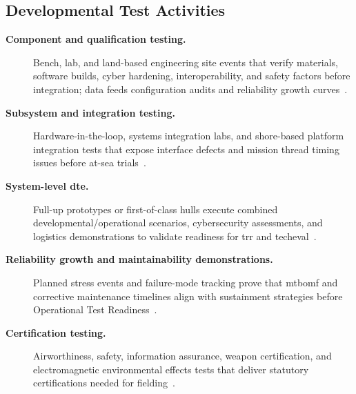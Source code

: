 \documentclass[../main.tex]{subfiles}
\begin{document}
\subsection{Developmental Test Activities}
\begin{description}
  \item[\textbf{Component and qualification testing.}] Bench, lab, and land-based engineering site events that verify materials, software builds, cyber hardening, interoperability, and safety factors before integration; data feeds configuration audits and reliability growth curves~\autocite{edo-3-5-5-test-eval-part-i-2025}.
  \item[\textbf{Subsystem and integration testing.}] Hardware-in-the-loop, systems integration labs, and shore-based platform integration tests that expose interface defects and mission thread timing issues before at-sea trials~\autocite{edo-3-5-5-test-eval-part-i-2025}.
  \item[\textbf{System-level \ac{dte}.}] Full-up prototypes or first-of-class hulls execute combined developmental/operational scenarios, cybersecurity assessments, and logistics demonstrations to validate readiness for \ac{trr} and \ac{techeval}~\autocite{DoDI5000-85}.
  \item[\textbf{Reliability growth and maintainability demonstrations.}] Planned stress events and failure-mode tracking prove that \ac{mtbomf} and corrective maintenance timelines align with sustainment strategies before Operational Test Readiness~\autocite{DoDI5000-89}.
  \item[\textbf{Certification testing.}] Airworthiness, safety, information assurance, weapon certification, and electromagnetic environmental effects tests that deliver statutory certifications needed for fielding~\autocite{edo-3-5-5-test-eval-part-i-2025}.
\end{description}
\end{document}

